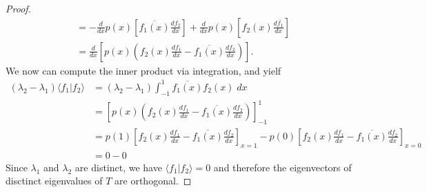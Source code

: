 \documentclass[11pt]{amsart}
\theoremstyle{definition}
\numberwithin{theorem}{section}
\numberwithin{definition}{section}
\numberwithin{equation}{section}
\begin{document}
{\begin{proof}
\begin{equation*}
\begin{aligned}
			&= -\frac{d}{dx} p(x) \left[\overline{f_1(x)} \frac{df_2}{dx}\right] + \frac{d}{dx} p(x) \left[f_2(x) \frac{d\overline{f_1}}{dx}\right] \\
			&= \frac{d}{dx} \left[p(x) \left(f_2(x) \frac{df_1}{dx} - \overline{f_1(x)}\frac{df_2}{dx}\right)\right].
	\end{aligned}
	\end{equation*}
	We now can compute the inner product via integration, and yielf
	\begin{equation*}
	\begin{aligned}
		(\lambda_2 - \lambda_1) \langle f_1 |  f_2\rangle &= (\lambda_2 - \lambda_1) \int_{-1}^1 \overline {f_1(x)} f_2(x)\; dx  \\
		&= \left[p(x) \left(f_2(x) \frac{df_1}{dx} - \overline{f_1(x)}\frac{df_2}{dx}\right)\right]_{-1}^1 \\
		&= p(1) \left[f_2(x) \frac{df_1}{dx} - \overline{f_1(x)}\frac{df_2}{dx}\right]_{x = 1} - p(0) \left[f_2(x) \frac{df_1}{dx} - \overline{f_1(x)}\frac{df_2}{dx}\right]_{x = 0}\\
		&= 0 - 0
	\end{aligned}
	\end{equation*}
	Since $\lambda_1$ and $\lambda_2$ are distinct, we have $\langle f_1 |  f_2\rangle = 0$ and therefore the eigenvectors of disctinct eigenvalues of $T$ are orthogonal. 
\end{proof}

\medskip {}}
\end{document}
